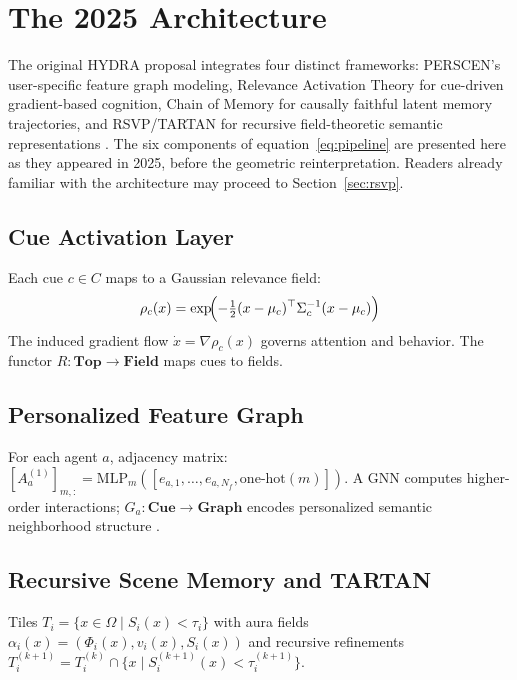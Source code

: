 \documentclass[12pt, a4paper]{article}
\theoremstyle{rsvpstyle}
\theoremstyle{definition}
\begin{document}
\section{The 2025 Architecture}

The original HYDRA proposal integrates four distinct frameworks:
PERSCEN's user-specific feature graph modeling, Relevance Activation Theory
for cue-driven gradient-based cognition, Chain of Memory for causally faithful
latent memory trajectories, and RSVP/TARTAN for recursive field-theoretic
semantic representations \citep{Friston2010}. The six components of
equation~\eqref{eq:pipeline} are presented here as they appeared in 2025,
before the geometric reinterpretation. Readers already familiar with the
architecture may proceed to Section~\ref{sec:rsvp}.

\subsection{Cue Activation Layer}

Each cue $c \in C$ maps to a Gaussian relevance field:
\begin{equation}
  \rho_c(x) = \exp\!\Bigl(-\tfrac{1}{2}(x-\mu_c)^\top\Sigma_c^{-1}(x-\mu_c)\Bigr)
\end{equation}
The induced gradient flow $\dot{x} = \nabla\rho_c(x)$ governs attention and behavior.
The functor $R : \mathbf{Top} \to \mathbf{Field}$ maps cues to fields.

\subsection{Personalized Feature Graph}

For each agent $a$, adjacency matrix:
$[A_a^{(1)}]_{m,:} = \mathrm{MLP}_m([e_{a,1},\ldots,e_{a,N_f},\mathrm{one\text{-}hot}(m)])$.
A GNN computes higher-order interactions; $G_a : \mathbf{Cue} \to \mathbf{Graph}$
encodes personalized semantic neighborhood structure \citep{ZhangEtAl2020}.

\subsection{Recursive Scene Memory and TARTAN}

Tiles $T_i = \{x \in \Omega \mid S_i(x) < \tau_i\}$ with aura fields
$\alpha_i(x) = (\Phi_i(x), v_i(x), S_i(x))$ and recursive refinements
$T_i^{(k+1)} = T_i^{(k)} \cap \{x \mid S_i^{(k+1)}(x) < \tau_i^{(k+1)}\}$.
\end{document}

